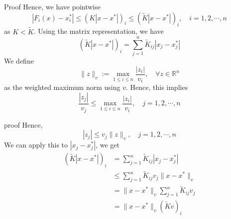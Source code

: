 \documentclass[aspectratio=169]{beamer} %
\begin{document}
\begin{frame}{Proof}
Hence, we have pointwise 
    $$
    |F_i(x)-x^*_i|\le (K|x-x^*|)_i \le (\tilde K|x-x^*|)_i,\quad i=1,2,\cdots, n
    $$
    as $K<\tilde K$. Using the matrix representation, we have
    $$
    (\tilde K|x-x^*|)_i= \sum_{j=1}^n \tilde K_{ij}|x_j-x_j^*|
    $$
    We define
    $$
    \|z\|_v:=\max_{1\le i\le n}\frac{|z_i|}{v_i},\quad \forall z\in \mathbb{R}^n
    $$
    as the weighted maximum norm using $v$. Hence, this implies
    $$
    \frac{|z_j|}{v_j}\le \max_{1\le i\le n}\frac{|z_i|}{v_i},\quad j=1,2,\cdots,n
    $$
    
\end{frame}
\begin{frame}{proof}
    Hence,
    $$
    |z_j|\le v_j\|z\|_v,\quad j=1,2,\cdots,n
    $$
    We can apply this to $|x_j-x_j^*|$, we get
    \begin{align*}
        (\tilde K|x-x^*|)_i &= \sum_{j=1}^n \tilde K_{ij}|x_j-x_j^*|\\
        &\le \sum_{j=1}^n \tilde K_{ij} v_j\|x-x^*\|_v\\
        &= \|x-x^*\|_v\sum_{j=1}^n \tilde K_{ij}v_j\\
        &= \|x-x^*\|_v(\tilde Kv)_i\\
    \end{align*}
    
\end{frame}
\end{document}
